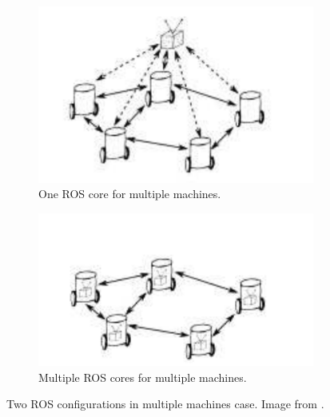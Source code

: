 \documentclass[11pt,openany]{book}
\begin{document}
\begin{figure}[H]
    \centering
    \begin{subfigure}[H]{0.4\linewidth}
        \includegraphics[width=\linewidth]{assets/4_8_a.png}
        \caption{{One ROS core for multiple machines.}}
        \label{fig:4.8a}
    \end{subfigure}
    \begin{subfigure}[H]{0.4\linewidth}
        \includegraphics[width=\linewidth]{assets/4_8_b.png}
        \caption{{Multiple ROS cores for multiple machines.}}
        \label{fig:4.8b}
    \end{subfigure}
    \caption{{Two ROS conﬁgurations in multiple machines case. Image from \cite{andre2014coordinated}.}}
    \label{fig:4.8}
\end{figure}
\end{document}

